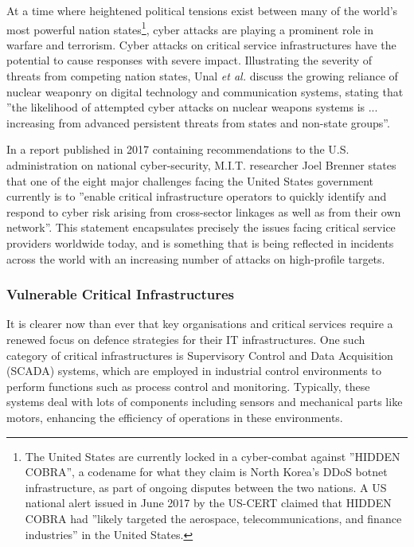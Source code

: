 At a time where heightened political tensions exist between many of the world's most powerful nation states\footnote{The United States are currently locked in a cyber-combat against ''HIDDEN COBRA'', a codename for what they claim is North Korea's DDoS botnet infrastructure, as part of ongoing disputes between the two nations. A US national alert \cite{HiddenCobra} issued in June 2017 by the US-CERT claimed that HIDDEN COBRA had ''likely targeted the aerospace, telecommunications, and finance industries'' in the United States.}, cyber attacks are playing a prominent role in warfare and terrorism. Cyber attacks on critical service infrastructures have the potential to cause responses with severe impact.  Illustrating the severity of threats from competing nation states,  Unal \textit{et al.} \cite{NuclearReport2018} discuss the growing reliance of nuclear weaponry on digital technology and communication systems, stating that ''the likelihood of attempted cyber attacks on nuclear weapons systems is ... increasing from advanced persistent threats from states and non-state groups''.

In a report published in 2017 containing recommendations to the U.S. administration on national cyber-security, \cite{brenner_2017} M.I.T. researcher Joel Brenner states that one of the eight major challenges facing the United States government currently is to ''enable critical infrastructure operators to quickly identify and respond to cyber risk arising from cross-sector linkages as well as from their own network''. This statement encapsulates precisely the issues facing critical service providers worldwide today, and is something that is being reflected in incidents across the world with an increasing number of attacks on high-profile targets.

\subsubsection{Vulnerable Critical Infrastructures}
 It is clearer now than ever that key organisations and critical services require a renewed focus on defence strategies for their IT infrastructures. One such category of critical infrastructures is Supervisory Control and Data Acquisition (SCADA) systems, which are employed in industrial control environments to perform functions such as process control and monitoring. Typically, these systems deal with lots of components including sensors and mechanical parts like motors, enhancing the efficiency of operations in these environments. 
 
